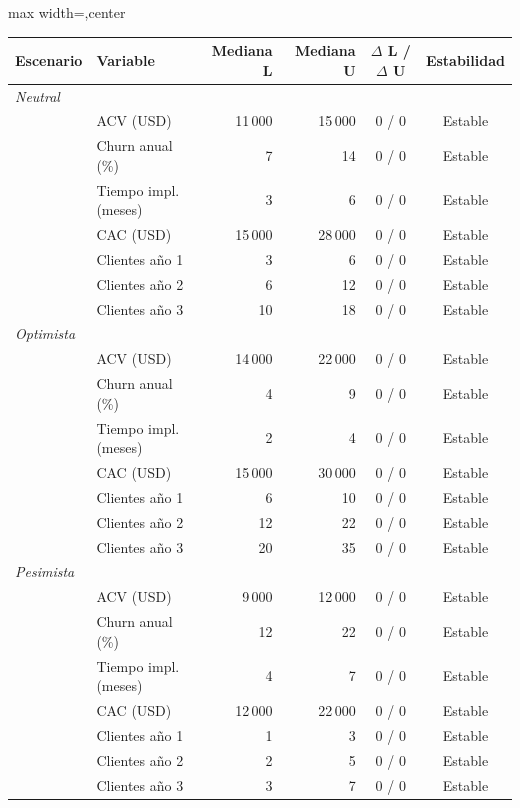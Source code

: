 \begin{center}
\footnotesize
\begin{adjustbox}{max width=\textwidth,center}
\begin{tabular}{llrrcc}
\hline
Escenario & Variable & Mediana L & Mediana U & $\Delta$ L / $\Delta$ U & Estabilidad \\
\hline
\multicolumn{6}{l}{\emph{Neutral}} \\
& ACV (USD) & 11\,000 & 15\,000 & 0 / 0 & Estable \\
& Churn anual (\%) & 7 & 14 & 0 / 0 & Estable \\
& Tiempo impl. (meses) & 3 & 6 & 0 / 0 & Estable \\
& CAC (USD) & 15\,000 & 28\,000 & 0 / 0 & Estable \\
& Clientes año 1 & 3 & 6 & 0 / 0 & Estable \\
& Clientes año 2 & 6 & 12 & 0 / 0 & Estable \\
& Clientes año 3 & 10 & 18 & 0 / 0 & Estable \\
\hline
\multicolumn{6}{l}{\emph{Optimista}} \\
& ACV (USD) & 14\,000 & 22\,000 & 0 / 0 & Estable \\
& Churn anual (\%) & 4 & 9 & 0 / 0 & Estable \\
& Tiempo impl. (meses) & 2 & 4 & 0 / 0 & Estable \\
& CAC (USD) & 15\,000 & 30\,000 & 0 / 0 & Estable \\
& Clientes año 1 & 6 & 10 & 0 / 0 & Estable \\
& Clientes año 2 & 12 & 22 & 0 / 0 & Estable \\
& Clientes año 3 & 20 & 35 & 0 / 0 & Estable \\
\hline
\multicolumn{6}{l}{\emph{Pesimista}} \\
& ACV (USD) & 9\,000 & 12\,000 & 0 / 0 & Estable \\
& Churn anual (\%) & 12 & 22 & 0 / 0 & Estable \\
& Tiempo impl. (meses) & 4 & 7 & 0 / 0 & Estable \\
& CAC (USD) & 12\,000 & 22\,000 & 0 / 0 & Estable \\
& Clientes año 1 & 1 & 3 & 0 / 0 & Estable \\
& Clientes año 2 & 2 & 5 & 0 / 0 & Estable \\
& Clientes año 3 & 3 & 7 & 0 / 0 & Estable \\
\hline
\end{tabular}
\end{adjustbox}
\end{center}

